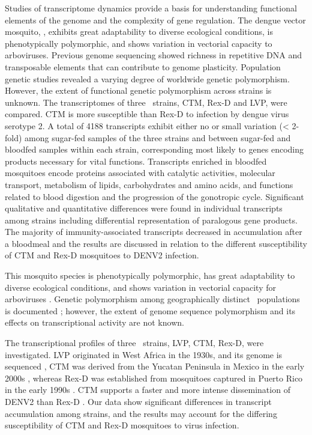 Studies of transcriptome dynamics provide a basis for understanding functional elements of the genome and the complexity of gene regulation.
The dengue vector mosquito, \Aea, exhibits great adaptability to diverse ecological conditions, is phenotypically polymorphic, and shows variation in vectorial capacity to arboviruses.
Previous genome sequencing showed richness in repetitive DNA and transposable elements that can contribute to genome plasticity.
Population genetic studies revealed a varying degree of worldwide genetic polymorphism.
However, the extent of functional genetic polymorphism across strains is unknown.
The transcriptomes of three \Aa\ strains, \gls{CTM}, \gls{Rex-D} and \gls{LVP}, were compared.
\gls{CTM} is more susceptible than \gls{Rex-D} to infection by dengue virus serotype 2.
A total of 4188 transcripts exhibit either no or small variation (< 2-fold) among sugar-fed samples of the three strains and between sugar-fed and bloodfed samples within each strain, corresponding most likely to genes encoding products necessary for vital functions.
Transcripts enriched in bloodfed mosquitoes encode proteins associated with catalytic activities, molecular transport, metabolism of lipids, carbohydrates and amino acids, and functions related to blood digestion and the progression of the gonotropic cycle.
Significant qualitative and quantitative differences were found in individual transcripts among strains including differential representation of paralogous gene products.
The majority of immunity-associated transcripts decreased in accumulation after a bloodmeal and the results are discussed in relation to the different susceptibility of \gls{CTM} and \gls{Rex-D} mosquitoes to \gls{DENV2} infection.

This mosquito species is phenotypically polymorphic, has great adaptability to diverse ecological conditions, and shows variation in vectorial capacity for arboviruses \cite{Bennett2002,Black2002,Kuno2010}.
Genetic polymorphism among geographically distinct \Aa\ populations is documented \cite{Urdaneta-Marquez2011}; however, the extent of genome sequence polymorphism and its effects on transcriptional activity are not known.

The transcriptional profiles of three \Aa\ strains, \gls{LVP}, \gls{CTM}, \gls{Rex-D}, were investigated.
\gls{LVP} originated in West Africa in the 1930s, and its genome is sequenced \cite{Nene2007}, \gls{CTM} was derived from the Yucatan Peninsula in Mexico in the early 2000s \cite{Bennett2002,Gubler1985,Richardson2006a}, whereas \gls{Rex-D} was established from mosquitoes captured in Puerto Rico in the early 1990s \cite{Miller1991}.
\gls{CTM} supports a faster and more intense dissemination of \gls{DENV2} than \gls{Rex-D} \cite{Bennett2002,Salazar2007}.
Our data show significant differences in transcript accumulation among strains, and the results may account for the differing susceptibility of \gls{CTM} and \gls{Rex-D} mosquitoes to virus infection.


